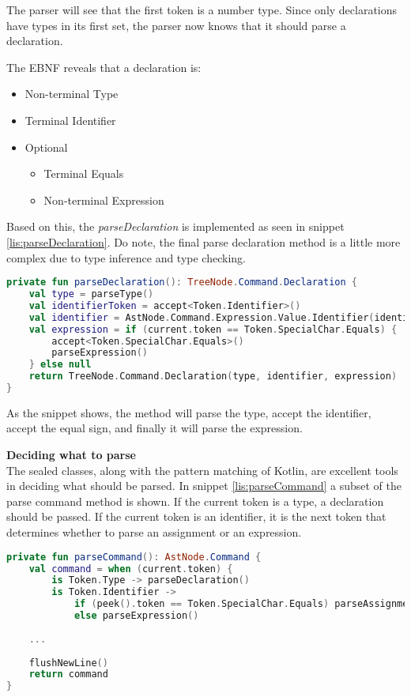 The parser will see that the first token is a number type. 
Since only declarations have types in its first set, the parser now knows that it should parse a declaration.

The EBNF reveals that a declaration is:
\begin{itemize}
	\item Non-terminal Type
	\item Terminal Identifier
	\item Optional
	\begin{itemize}
		\item Terminal Equals
		\item Non-terminal Expression
	\end{itemize}
\end{itemize}

Based on this, the \textit{parseDeclaration} is implemented as seen in snippet \ref{lis:parseDeclaration}.
Do note, the final parse declaration method is a little more complex due to type inference and type checking.

\begin{lstlisting}[language=Kotlin,label=lis:parseDeclaration,caption=A simplified version of the parse declaration method from the parser.]
private fun parseDeclaration(): TreeNode.Command.Declaration {
    val type = parseType()
    val identifierToken = accept<Token.Identifier>()
    val identifier = AstNode.Command.Expression.Value.Identifier(identifierToken.value)
    val expression = if (current.token == Token.SpecialChar.Equals) {
	    accept<Token.SpecialChar.Equals>()
	    parseExpression()
    } else null
    return TreeNode.Command.Declaration(type, identifier, expression)
}
\end{lstlisting}

As the snippet shows, the method will parse the type, accept the identifier, accept the equal sign, and finally it will parse the expression.

\textbf{Deciding what to parse}\\
The sealed classes, along with the pattern matching of Kotlin, are excellent tools in deciding what should be parsed. 
In snippet \ref{lis:parseCommand} a subset of the parse command method is shown. 
If the current token is a type, a declaration should be passed. 
If the current token is an identifier, it is the next token that determines whether to parse an assignment or an expression.

\begin{lstlisting}[language=Kotlin,label=lis:parseCommand,caption=A simplified version of the parse declaration method from the parser.]
private fun parseCommand(): AstNode.Command {
    val command = when (current.token) {
	    is Token.Type -> parseDeclaration()
	    is Token.Identifier ->
		    if (peek().token == Token.SpecialChar.Equals) parseAssignment() 
		    else parseExpression()
    
    ...
    
    flushNewLine()
    return command
}
\end{lstlisting}


